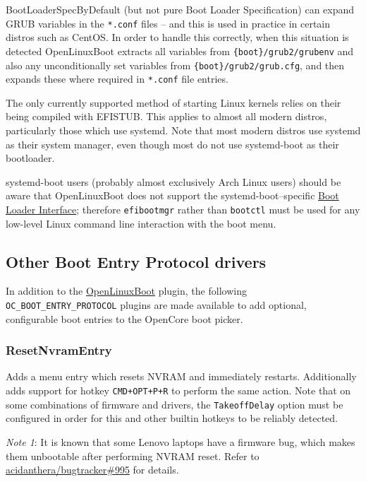 \documentclass[]{article}
\begin{document}
BootLoaderSpecByDefault (but not pure Boot Loader Specification) can expand GRUB variables
in the \texttt{*.conf} files -- and this is used in practice in certain distros such as CentOS.
In order to handle this correctly, when this situation is detected OpenLinuxBoot extracts all variables from
\texttt{\{boot\}/grub2/grubenv} and also any unconditionally set variables from
\texttt{\{boot\}/grub2/grub.cfg}, and then expands these where required in \texttt{*.conf} file entries.

The only currently supported method of starting Linux kernels relies on their being compiled with EFISTUB.
This applies to almost all modern distros, particularly those which use systemd. Note that most modern
distros use systemd as their system manager, even though most do not use systemd-boot as
their bootloader.

systemd-boot users (probably almost exclusively Arch Linux users) should be aware that OpenLinuxBoot
does not support the systemd-boot--specific \href{https://systemd.io/BOOT\_LOADER\_INTERFACE/}{Boot Loader Interface};
therefore \texttt{efibootmgr} rather than \texttt{bootctl} must be used for any low-level Linux command line interaction
with the boot menu.

\subsection{Other Boot Entry Protocol drivers}

In addition to the \hyperref[uefilinux]{OpenLinuxBoot} plugin, the following \texttt{OC\_BOOT\_ENTRY\_PROTOCOL}
plugins are made available to add optional, configurable boot entries to the OpenCore boot picker.

\subsubsection{ResetNvramEntry}\label{uefiresetnvram}

Adds a menu entry which resets NVRAM and immediately restarts. Additionally adds support for hotkey
\texttt{CMD+OPT+P+R} to perform the same action. Note that on some combinations of firmware and
drivers, the \texttt{TakeoffDelay} option must be configured in order for this
and other builtin hotkeys to be reliably detected.

\emph{Note 1}: It is known that some Lenovo laptops have a firmware
bug, which makes them unbootable after performing NVRAM reset. Refer to
\href{https://github.com/acidanthera/bugtracker/issues/995}{acidanthera/bugtracker\#995}
for details.
\end{document}
